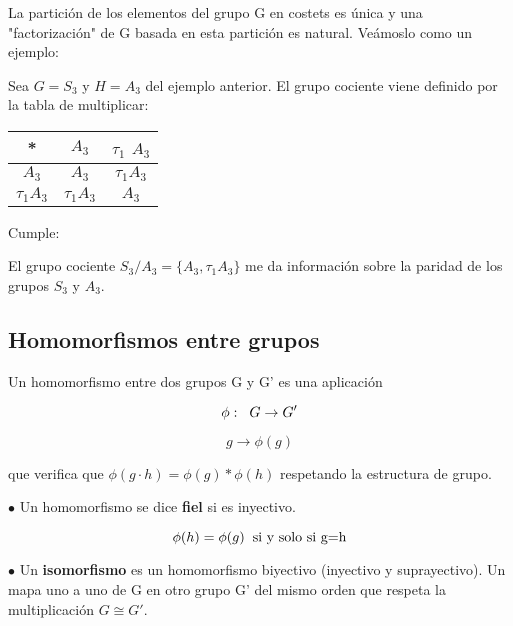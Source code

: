 \documentclass{article}
\begin{document}
 La partición de los elementos del grupo G en costets es única y una "factorización" de G basada en esta partición es natural. Veámoslo como un ejemplo:

 \smallskip
 Sea $G=S_3$ y $H=A_3$ del ejemplo anterior. El grupo cociente viene definido por la tabla de multiplicar:
 \begin{center}
\begin{tabular}[b]{ c | c c}
 * & $A_3$ & $\tau _1$ $A_3$\\
 \hline
 $A_3$ & $A_3$ & $\tau _1 A_3$ \\

 $\tau _1 A_3$ & $\tau _1 A_3$ & $A_3$
 \end{tabular}

 \end{center}


 Cumple:


 \smallskip
 El grupo cociente $S_3/A_3= \lbrace A_3, \tau _1 A_3\rbrace $ me da información sobre la paridad de los grupos $S_3$ y $A_3$.

 \subsection{Homomorfismos entre grupos}
 Un homomorfismo entre dos grupos G y G' es una aplicación

 $$\phi : \hspace{0.2cm} G \rightarrow G'$$

 $$g\rightarrow \phi(g)$$

 que verifica que $\phi (g\cdot h)=\phi (g)*\phi (h)$ respetando la estructura de grupo.

 \smallskip
$\bullet$ Un homomorfismo se dice \textbf{fiel} si es inyectivo.

 $$\phi (h)=\phi (g) \hspace{0.2cm} \text{si y solo si g=h}$$

 \smallskip
$\bullet$ Un \textbf{isomorfismo} es un homomorfismo biyectivo (inyectivo y suprayectivo). Un mapa uno a uno de G en otro grupo G' del mismo orden que respeta la multiplicación $G\cong G'$.
\end{document}
